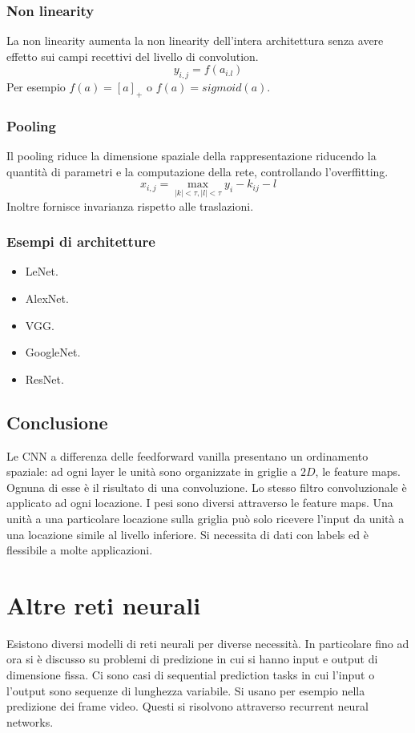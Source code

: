 		\subsubsection{Non linearity}
		La non linearity aumenta la non linearity dell'intera architettura senza avere effetto sui campi recettivi del livello di convolution.
		$$y_{i,j} = f(a_{i.l})$$
		Per esempio $f(a) = [a]_+$ o $f(a) = sigmoid(a)$.
		
		\subsubsection{Pooling}
		Il pooling riduce la dimensione spaziale della rappresentazione riducendo la quantit\`a di parametri e la computazione della rete, controllando l'overffitting.
		$$x_{i,j} = \max\limits_{|k|<\tau, |l|<\tau}y_i - k_{ij} - l$$
		Inoltre fornisce invarianza rispetto alle traslazioni.
		
		\subsubsection{Esempi di architetture}
		\begin{multicols}{2}
			\begin{itemize}
				\item LeNet.
				\item AlexNet.
				\item VGG.
				\item GoogleNet.
				\item ResNet.
			\end{itemize}
		\end{multicols}

	\subsection{Conclusione}
	Le CNN a differenza delle feedforward vanilla presentano un ordinamento spaziale: ad ogni layer le unit\`a sono organizzate in griglie a $2D$, le feature maps.
	Ognuna di esse \`e il risultato di una convoluzione.
	Lo stesso filtro convoluzionale \`e applicato ad ogni locazione.
	I pesi sono diversi attraverso le feature maps.
	Una unit\`a a una particolare locazione sulla griglia pu\`o solo ricevere l'input da unit\`a a una locazione simile al livello inferiore.
	Si necessita di dati con labels ed \`e flessibile a molte applicazioni.

\section{Altre reti neurali}
Esistono diversi modelli di reti neurali per diverse necessit\`a.
In particolare fino ad ora si \`e discusso su problemi di predizione in cui si hanno input e output di dimensione fissa.
Ci sono casi di sequential prediction tasks in cui l'input o l'output sono sequenze di lunghezza variabile.
Si usano per esempio nella predizione dei frame video. 
Questi si risolvono attraverso recurrent neural networks.

